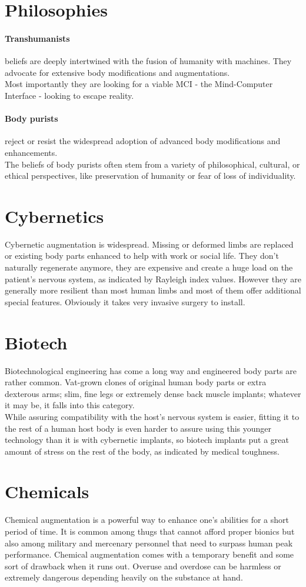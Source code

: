 \section{Philosophies}
\paragraph{Transhumanists} beliefs are deeply intertwined with the fusion of humanity with machines. They advocate for extensive body modifications and augmentations.\\
Most importantly they are looking for a viable MCI - the Mind-Computer Interface - looking to escape reality.
\paragraph{Body purists} reject or resist the widespread adoption of advanced body modifications and enhancements.\\
The beliefs of body purists often stem from a variety of philosophical, cultural, or ethical perspectives, like preservation of humanity or fear of loss of individuality.

\section{Cybernetics}
Cybernetic augmentation is widespread. Missing or deformed limbs are replaced or existing body parts enhanced to help with work or social life. They don’t naturally regenerate anymore, they are expensive and create a huge load on the patient’s nervous system, as indicated by Rayleigh index values. However they are generally more resilient than most human limbs and most of them offer additional special features. Obviously it takes very invasive surgery to install.
\section{Biotech}
Biotechnological engineering has come a long way and engineered body parts are rather common. Vat-grown clones of original human body parts or extra dexterous arms; slim, fine legs or extremely dense back muscle implants; whatever it may be, it falls into this category.\\
While assuring compatibility with the host's nervous system is easier, fitting it to the rest of a human host body is even harder to assure using this younger technology than it is with cybernetic implants, so biotech implants put a great amount of stress on the rest of the body, as indicated by medical toughness.
\section{Chemicals}
Chemical augmentation is a powerful way to enhance one’s abilities for a short period of time. It is common among thugs that cannot afford proper bionics but also among military and mercenary personnel that need to surpass human peak performance. Chemical augmentation comes with a temporary benefit and some sort of drawback when it runs out. Overuse and overdose can be harmless or extremely dangerous depending heavily on the substance at hand.